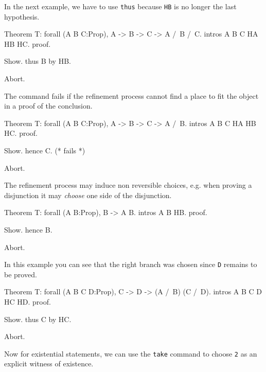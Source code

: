 In the next example, we have to use {\tt thus} because {\tt HB} is no longer
the last hypothesis.

\begin{coq_eval}
Theorem T: forall (A B C:Prop), A -> B -> C -> A /\ B /\ C.
intros A B C HA HB HC.
proof.
\end{coq_eval} 
\begin{coq_example}
Show.
thus B by HB.
\end{coq_example}
\begin{coq_eval}
Abort.
\end{coq_eval}

The command fails if the refinement process cannot find a place to fit
the object in a proof of the conclusion.


\begin{coq_eval}
Theorem T: forall (A B C:Prop), A -> B -> C -> A /\ B.
intros A B C HA HB HC.
proof.
\end{coq_eval} 
\begin{coq_example}
Show.
hence C. (* fails *)
\end{coq_example}
\begin{coq_eval}
Abort.
\end{coq_eval}

The refinement process may induce non
reversible choices, e.g. when proving a disjunction it may {\it
  choose} one side of the disjunction.

\begin{coq_eval}
Theorem T: forall (A B:Prop), B -> A \/ B.
intros A B HB.
proof.
\end{coq_eval} 
\begin{coq_example}
Show.
hence B.
\end{coq_example}
\begin{coq_eval}
Abort.
\end{coq_eval}

In this example you can see that the right branch was chosen since {\tt D} remains to be proved.

\begin{coq_eval}
Theorem T: forall (A B C D:Prop), C -> D -> (A /\ B) \/ (C /\ D).
intros A B C D HC HD.
proof.
\end{coq_eval} 
\begin{coq_example}
Show.
thus C by HC.
\end{coq_example}
\begin{coq_eval}
Abort.
\end{coq_eval}

Now for existential statements, we can use the {\tt take} command to
choose {\tt 2} as an explicit witness of existence.

